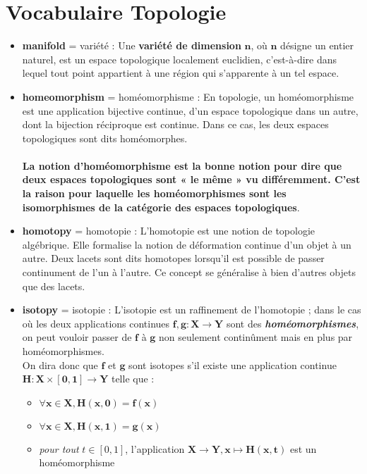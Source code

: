 \documentclass[french]{article}
\begin{document}
\section{Vocabulaire Topologie}
\begin{itemize}[label=\textbullet, font=\LARGE \color{blue}]
	\item \textbf{manifold} = variété : Une \textbf{variété de dimension} $\bm{n}$, où $\bm{n}$ désigne un entier naturel, est un espace topologique localement euclidien, c'est-à-dire dans lequel tout point appartient à une région qui s'apparente à un tel espace. \\
	
	\item \textbf{homeomorphism} = homéomorphisme : En topologie, un homéomorphisme est une application bijective continue, d'un espace topologique dans un autre, dont la bijection réciproque est continue. Dans ce cas, les deux espaces topologiques sont dits homéomorphes.\\\\	
	\textbf{La notion d'homéomorphisme est la bonne notion pour dire que deux espaces topologiques sont « le même » vu différemment. C'est la raison pour laquelle les homéomorphismes sont les isomorphismes de la catégorie des espaces topologiques}.\\
	
	\item \textbf{homotopy} = homotopie :
	L'homotopie est une notion de topologie algébrique. Elle formalise la notion de déformation continue d'un objet à un autre. Deux lacets sont dits homotopes lorsqu'il est possible de passer continument de l'un à l'autre. Ce concept se généralise à bien d'autres objets que des lacets.\\
	
	\item \textbf{isotopy} = isotopie : L’isotopie est un raffinement de l'homotopie ; dans le cas où les deux applications continues $\bm{f,g : X \rightarrow Y}$ sont des \textbf{\textit{homéomorphismes}}, on peut vouloir passer de $\bm{f}$ à $\bm{g}$ non seulement continûment mais en plus par homéomorphismes.\\
	
	On dira donc que $\bm{f}$ et $\bm{g}$ sont isotopes s’il existe une application continue $\bm{H : X \times [0, 1] \rightarrow Y}$ telle que :
	\begin{itemize}[label=$\star$]
		\item $\bm{\forall x \in X, H(x, 0)=f(x)}$
		\item $\bm{\forall x \in X, H(x, 1)=g(x)}$
		\item \textit{pour tout }$t\in[0,1]$, l'application $\bm{X \rightarrow Y, x \mapsto H(x,t)}$ est un homéomorphisme\\
	\end{itemize}
	

\end{itemize}
\end{document}
